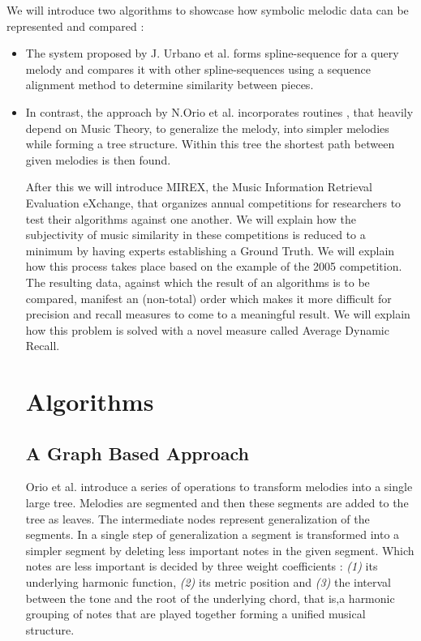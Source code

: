 \documentclass{llncs}
\begin{document}
		We will introduce two algorithms to showcase how symbolic melodic data can be represented and compared :
		\begin{itemize}
		\item The system proposed by J. Urbano et al. \cite{five_point_five} forms spline-sequence for a query melody and compares it with other spline-sequences using a sequence alignment method to determine similarity between pieces. 
		\item In contrast, the approach by N.Orio et al. \cite{two_point_four} incorporates routines , that heavily depend on Music Theory, to generalize the melody, into simpler melodies while forming a tree structure. Within this tree the shortest path between given melodies is then found.

        After this we will introduce MIREX, the Music Information Retrieval Evaluation eXchange, that organizes annual competitions for researchers to test their algorithms against one another. We will explain how the subjectivity of music similarity in these competitions is reduced to a minimum by having experts establishing a Ground Truth. We will explain how this process takes place based on the example of the 2005 competition. The resulting data, against which the result of an algorithms is to be compared, manifest an (non-total) order which makes it more difficult for precision and recall measures to come to a meaningful result. We will explain how this problem is solved with a novel measure called Average Dynamic Recall.
	

		 
		
	\section{Algorithms}

		\subsection{A Graph Based Approach}

		Orio et al. \cite{two_point_four} introduce  a series of operations to transform melodies into a single large tree. Melodies are segmented and then these segments are added to the tree as leaves. The intermediate nodes represent generalization of the segments. 
		In a single step of generalization a segment is transformed into a simpler segment by deleting less important notes in the given segment. Which notes are less important is decided by three weight coefficients : \textit{(1)} its underlying harmonic function, \textit{(2)} its metric position  and \textit{(3)} the interval between the tone and the root of the underlying chord, that is,a harmonic grouping of notes that are played together forming a unified musical structure.
		

\end{itemize}
\end{document}
